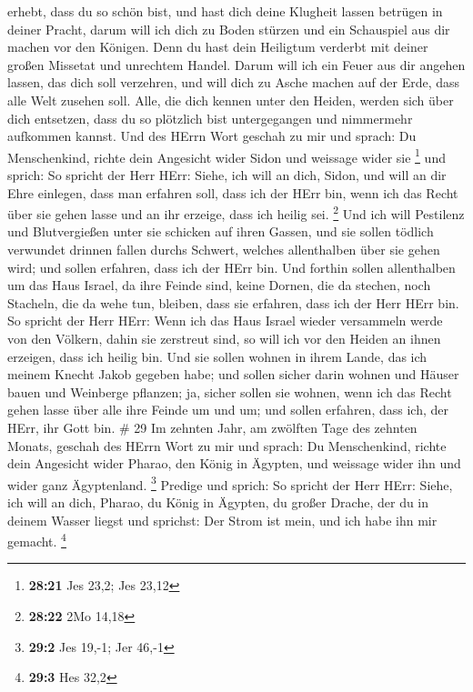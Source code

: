 erhebt, dass du so schön bist, und hast dich deine Klugheit lassen
betrügen in deiner Pracht, darum will ich dich zu Boden stürzen und ein
Schauspiel aus dir machen vor den Königen.  Denn du hast
dein Heiligtum verderbt mit deiner großen Missetat und unrechtem Handel.
Darum will ich ein Feuer aus dir angehen lassen, das dich soll
verzehren, und will dich zu Asche machen auf der Erde, dass alle Welt
zusehen soll.  Alle, die dich kennen unter den Heiden,
werden sich über dich entsetzen, dass du so plötzlich bist untergegangen
und nimmermehr aufkommen kannst.  Und des HErrn Wort
geschah zu mir und sprach:  Du Menschenkind, richte dein
Angesicht wider Sidon und weissage wider sie \footnote{\textbf{28:21}
  Jes 23,2; Jes 23,12}  und sprich: So spricht der Herr
HErr: Siehe, ich will an dich, Sidon, und will an dir Ehre einlegen,
dass man erfahren soll, dass ich der HErr bin, wenn ich das Recht über
sie gehen lasse und an ihr erzeige, dass ich heilig sei. \footnote{\textbf{28:22}
  2Mo 14,18}  Und ich will Pestilenz und Blutvergießen
unter sie schicken auf ihren Gassen, und sie sollen tödlich verwundet
drinnen fallen durchs Schwert, welches allenthalben über sie gehen wird;
und sollen erfahren, dass ich der HErr bin.  Und forthin
sollen allenthalben um das Haus Israel, da ihre Feinde sind, keine
Dornen, die da stechen, noch Stacheln, die da wehe tun, bleiben, dass
sie erfahren, dass ich der Herr HErr bin.  So spricht der
Herr HErr: Wenn ich das Haus Israel wieder versammeln werde von den
Völkern, dahin sie zerstreut sind, so will ich vor den Heiden an ihnen
erzeigen, dass ich heilig bin. Und sie sollen wohnen in ihrem Lande, das
ich meinem Knecht Jakob gegeben habe;  und sollen sicher
darin wohnen und Häuser bauen und Weinberge pflanzen; ja, sicher sollen
sie wohnen, wenn ich das Recht gehen lasse über alle ihre Feinde um und
um; und sollen erfahren, dass ich, der HErr, ihr Gott bin. \# 29
 Im zehnten Jahr, am zwölften Tage des zehnten Monats,
geschah des HErrn Wort zu mir und sprach:  Du Menschenkind,
richte dein Angesicht wider Pharao, den König in Ägypten, und weissage
wider ihn und wider ganz Ägyptenland. \footnote{\textbf{29:2} Jes 19,-1;
  Jer 46,-1}  Predige und sprich: So spricht der Herr HErr:
Siehe, ich will an dich, Pharao, du König in Ägypten, du großer Drache,
der du in deinem Wasser liegst und sprichst: Der Strom ist mein, und ich
habe ihn mir gemacht. \footnote{\textbf{29:3} Hes 32,2} 
